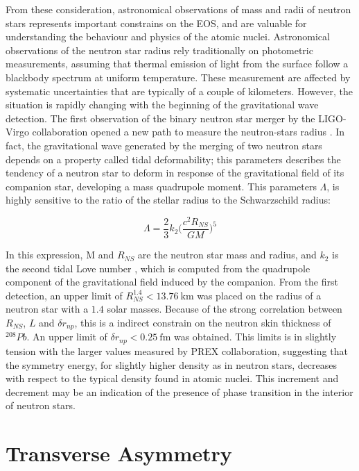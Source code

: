 From these consideration, astronomical observations of mass and radii of neutron stars represents important constrains on the EOS, and are valuable for understanding the behaviour and physics of the atomic nuclei.
Astronomical observations of the neutron star radius rely traditionally on photometric measurements, assuming that thermal emission of light from the surface follow a blackbody spectrum at uniform temperature. These measurement are affected by systematic uncertainties that are typically of a couple of kilometers.
However, the situation is rapidly changing with the beginning of the gravitational wave detection. The first observation of the binary neutron star merger by the LIGO-Virgo collaboration opened a new path to measure the neutron-stars radius \cite{LIGOScientific:2017vwq}. In fact, the gravitational wave generated by the merging of two neutron stars depends on a property called tidal deformability; this parameters describes the tendency of a neutron star to deform in response of the gravitational field of its companion star, developing a mass quadrupole moment. This parameters $\Lambda$, is highly sensitive to the ratio of the stellar radius to the Schwarzschild radius:

\begin{equation}
\Lambda = \frac{2}{3} k_{2} \big( \dfrac{c^{2} R_{NS}}{GM} \big)^{5}
\end{equation}

In this expression, M and $R_{NS}$ are the neutron star mass and radius, and $k_{2}$ is the second tidal Love number \cite{Binnington:2009bb}, which is computed from the quadrupole component of the gravitational field induced by the companion. From the first detection, an upper limit of $R_{NS}^{1.4} < \SI{13.76}{\kilo \meter}$ was placed on the radius of a neutron star with a $1.4$ solar masses. Because of the strong correlation between $R_{NS}$, $L$ and $\delta r_{np}$, this is a indirect constrain on the neutron skin thickness of $^{208}Pb$. An upper limit of $\delta r_{np} < \SI{0.25}{\femto \meter}$ was obtained. This limits is in slightly tension with the larger values measured by PREX collaboration, suggesting that the symmetry energy, for slightly higher density as in neutron stars, decreases with respect to the typical density found in atomic nuclei. This increment and decrement may be an indication of the presence of phase transition in the interior of neutron stars.

\section{Transverse Asymmetry}

